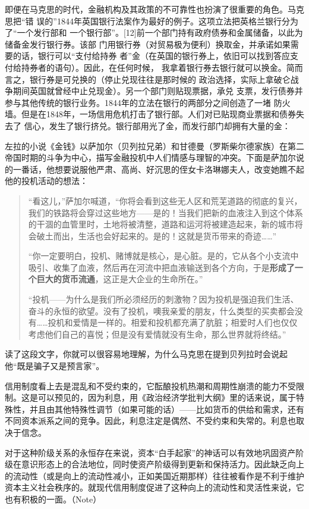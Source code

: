 即便在马克思的时代，金融机构及其政策的不可靠性也扮演了很重要的角色。马克思把“错
误的”1844年英国银行法案作为最好的例子。这项立法把英格兰银行分为了“一个发行部和
一个银行部”。[12]前一个部门持有政府债券和金属储备，以此为储备金发行银行券。该部
门用银行券（对贸易极为便利）换取金，并承诺如果需要的话，银行可以“支付给持券
者”金（在英国的银行券上，依旧可以找到答应支付给持券者的语句）。因此，在任何时候，
我拿着银行券去银行就可以换金。简而言之，银行券是可兑换的（停止兑现往往是那时候的
政治选择，实际上拿破仑战争期间英国就曾经中止兑现金）。另一个部门则贴现票据，承兑
支票，发行债券并参与其他传统的银行业务。1844年的立法在银行的两部分之间创造了一堵
防火墙。但是在1848年，一场信用危机打击了银行部。人们对已贴现商业票据和债券失去了
信心，发生了银行挤兑。银行部用光了金，而发行部门却拥有大量的金：

左拉的小说《金钱》以萨加尔（贝列拉兄弟）和甘德曼（罗斯柴尔德家族）在第二帝国时期的斗争为中心，描写金融投机中人们情感与理智的冲突。下面是萨加尔说的一番话，他想要说服他严肃、高尚、好沉思的侄女卡洛琳娜夫人，改变她瞧不起他的投机活动的想法：

\begin{quotation}
“看这儿，”萨加尔喊道，“你将会看到这些无人区和荒芜道路的彻底的复兴，我们的铁路将会穿过这些地方——是的！当我们把新的血液注入到这个体系的干涸的血管里时，土地将被清整，道路和运河将被建造起来，新的城市将会破土而出，生活也会好起来的。是的！这就是货币带来的奇迹……”

“你一定要明白，投机、赌博就是核心，是心脏。是的，它从各个小支流中吸引、收集了血液，然后再在河流中把血液输送到各个方向，于是\textbf{形成了一个巨大的货币流通}，这正是大企业的生命所在。”

“投机——为什么是我们所必须经历的刺激物？因为投机是强迫我们生活、奋斗的永恒的欲望。没有了投机，噢我亲爱的朋友，什么类型的买卖都会没有……投机和爱情是一样的。相爱和投机都充满了肮脏；相爱时人们也仅仅考虑他们自己的喜悦；但是没有爱情就没有生命，那么世界就将终结。”
\end{quotation}

读了这段文字，你就可以很容易地理解，为什么马克思在提到贝列拉时会说起他“既是骗子又是预言家”。


信用制度看上去是混乱和不受约束的，它酝酿投机热潮和周期性崩溃的能力不受限制。这是可以预见的，因为利息，用《政治经济学批判大纲》里的话来说，属于特殊性，并且由其他特殊性调节（如果可能的话）——比如货币的供给和需求，还有不同资本派系之间的竞争。因此，利息注定是偶然、不受约束和失常的。利息也取决于信念。

对于这种阶级关系的永恒存在来说，资本“白手起家”的神话可以有效地巩固资产阶级在意识形态上的合法地位，同时使资产阶级得到更新和保持活力。因此缺乏向上的流动性（或是向上的流动性减小，正如美国近期那样）往往被看作是不利于维护资本主义社会秩序的。就现代信用制度促进了这种向上的流动性和灵活性来说，它也有积极的一面。（Note）

